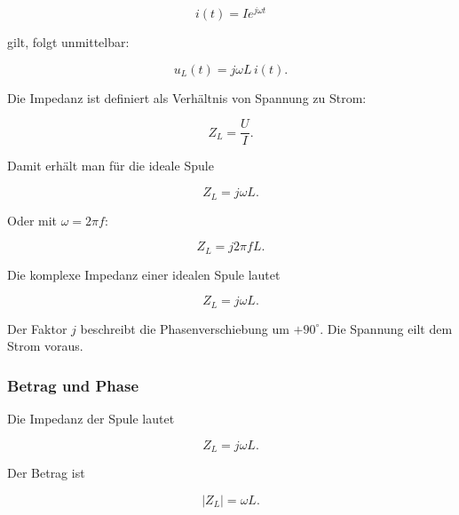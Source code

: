 \begin{equation}
	i(t) = \hat{I} e^{j\omega t}
	\label{eq:spule-komplexer-strom-wiederholung}
\end{equation}

gilt, folgt unmittelbar:

\begin{equation}
	u_L(t) = j\omega L \, i(t).
	\label{eq:spule-u-gleich-z-mal-i}
\end{equation}

Die Impedanz ist definiert als Verhältnis von Spannung zu Strom:

\begin{equation}
	Z_L = \frac{U}{I}.
	\label{eq:definition-impedanz-spule}
\end{equation}

Damit erhält man für die ideale Spule

\begin{equation}
	Z_L = j\omega L.
	\label{eq:impedanz-spule}
\end{equation}

Oder mit \(\omega = 2\pi f\):

\begin{equation}
	Z_L = j 2\pi f L.
	\label{eq:impedanz-spule-frequenz}
\end{equation}

\begin{MathBox}
	\label{box:impedanz-ideale-spule}
	Die komplexe Impedanz einer idealen Spule lautet
	
	\[
	Z_L = j\omega L.
	\]
	
	Der Faktor \(j\) beschreibt die Phasenverschiebung um \(+90^\circ\).
	Die Spannung eilt dem Strom voraus.
\end{MathBox}

\subsubsection{Betrag und Phase}
\label{subsubsec:betrag-und-phase-spule}

Die Impedanz der Spule lautet

\begin{equation}
	Z_L = j\omega L.
	\label{eq:spule-impedanz-betrag-phase-ausgangspunkt}
\end{equation}

Der Betrag ist

\begin{equation}
	|Z_L| = \omega L.
	\label{eq:betrag-impedanz-spule}
\end{equation}

